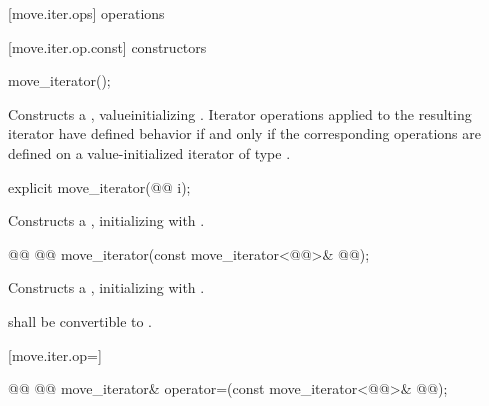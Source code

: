 [move.iter.ops]{ operations}

[move.iter.op.const]{ constructors}

%
\begin{itemdecl}
move_iterator();
\end{itemdecl}

\begin{itemdescr}
\pnum
\effects Constructs a , value\newnewtxt{-}initializing
. Iterator operations applied to the resulting
iterator have defined behavior if and only if the corresponding operations are defined
on a value-initialized iterator of type .
\end{itemdescr}


%
\begin{itemdecl}
explicit move_iterator(@@ i);
\end{itemdecl}

\begin{itemdescr}
\pnum
\effects Constructs a , initializing
 with .
\end{itemdescr}


%
\begin{itemdecl}
@@
  @@
move_iterator(const move_iterator<@@>& @@);
\end{itemdecl}

\begin{itemdescr}
\pnum
\effects Constructs a , initializing
 with .

\begin{removedblock}
\pnum
\requires {} shall be convertible to
.
\end{removedblock}
\end{itemdescr}

[move.iter.op=]{}

%
%
\begin{itemdecl}
@@
  @@
move_iterator& operator=(const move_iterator<@@>& @@);
\end{itemdecl}

